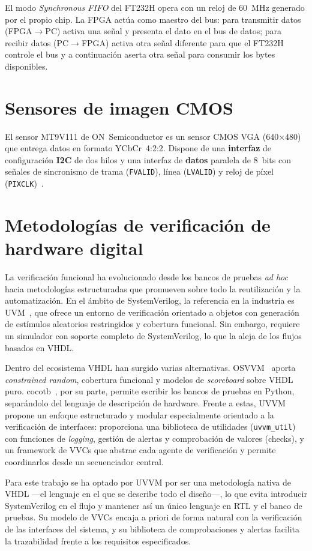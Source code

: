 \documentclass[../main.tex]{subfiles}
\begin{document}
El modo \textit{Synchronous FIFO} del FT232H opera con un reloj de 60~MHz generado por el propio chip. La FPGA actúa como maestro del bus: para transmitir datos (FPGA$\rightarrow$PC) activa una señal y presenta el dato en el bus de datos; para recibir datos (PC$\rightarrow$FPGA) activa otra señal diferente para que el FT232H controle el bus y a continuación aserta otra señal para consumir los bytes disponibles.
\section{Sensores de imagen CMOS}

El sensor MT9V111 de ON~Semiconductor es un sensor CMOS \ac{VGA} (640$\times$480) que entrega datos en formato YCbCr~4:2:2. Dispone de una \textbf{interfaz} de configuración \textbf{I2C} de dos hilos y una interfaz de \textbf{datos} paralela de 8~bits con señales de sincronismo de trama (\texttt{FVALID}), línea (\texttt{LVALID}) y reloj de píxel (\texttt{PIXCLK})~\cite{mt9v111_datasheet}. 

\section{Metodologías de verificación de hardware digital}


La verificación funcional ha evolucionado desde los bancos de pruebas \textit{ad hoc} hacia metodologías estructuradas que promueven sobre todo la reutilización y la automatización. En el ámbito de SystemVerilog, la referencia en la industria es \ac{UVM}~\cite{uvm}, que ofrece un entorno de verificación orientado a objetos con generación de estímulos aleatorios restringidos y cobertura funcional. Sin embargo, requiere un simulador con soporte completo de SystemVerilog, lo que la aleja de los flujos basados en VHDL.

Dentro del ecosistema VHDL han surgido varias alternativas. \ac{OSVVM}~\cite{osvvm} aporta \textit{constrained random}, cobertura funcional y modelos de \textit{scoreboard} sobre VHDL puro. cocotb~\cite{cocotb}, por su parte, permite escribir los bancos de pruebas en Python, separándolo del lenguaje de descripción de hardware. Frente a estas, \ac{UVVM}~\cite{uvvm} propone un enfoque estructurado y modular especialmente orientado a la verificación de interfaces: proporciona una biblioteca de utilidades (\texttt{uvvm\_util}) con funciones de \textit{logging}, gestión de alertas y comprobación de valores (checks), y un framework de \ac{VVC}s que abstrae cada agente de verificación y permite coordinarlos desde un secuenciador central.

Para este trabajo se ha optado por \ac{UVVM} por ser una metodología nativa de VHDL —el lenguaje en el que se describe todo el diseño—, lo que evita introducir SystemVerilog en el flujo y mantener así un único lenguaje en \ac{RTL} y el banco de pruebas. Su modelo de \ac{VVC}s encaja a priori de forma natural con la verificación de las interfaces del sistema, y su biblioteca de comprobaciones y alertas facilita la trazabilidad frente a los requisitos especificados.
\end{document}

